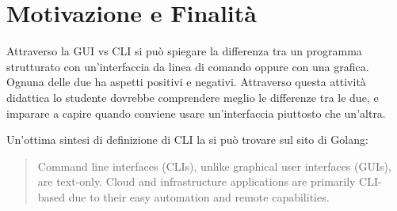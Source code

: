 \section{Motivazione e Finalità}

Attraverso la GUI vs CLI si può spiegare la differenza tra un programma strutturato con un'interfaccia da linea di comando oppure con una grafica. Ognuna delle due ha aspetti positivi e  negativi. Attraverso questa attività didattica lo studente dovrebbe comprendere meglio le differenze tra le due, e imparare a capire quando conviene usare un'interfaccia piuttosto che un'altra.

Un'ottima sintesi di definizione di CLI la si può trovare sul sito di Golang: \newline
\begin{quote}
    
Command line interfaces (CLIs), unlike graphical user interfaces (GUIs), are text-only. Cloud and infrastructure applications are primarily CLI-based due to their easy automation and remote capabilities. 

\end{quote}